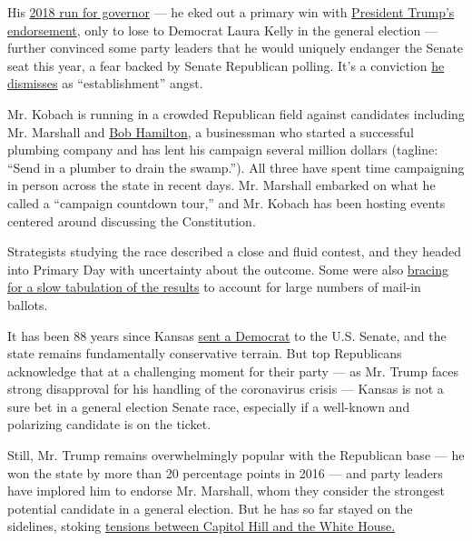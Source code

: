 His
\href{https://www.nytimes3xbfgragh.onion/2018/11/06/us/laura-kelly-wins-kansas-governors-race.html}{2018
run for governor} --- he eked out a primary win with
\href{https://www.nytimes3xbfgragh.onion/2018/08/06/us/politics/kris-kobach-trump-kansas.html}{President
Trump's endorsement}, only to lose to Democrat Laura Kelly in the
general election --- further convinced some party leaders that he would
uniquely endanger the Senate seat this year, a fear backed by Senate
Republican polling. It's a conviction
\href{https://www.nytimes3xbfgragh.onion/2020/07/30/us/politics/kansas-senate-kobach-trump.html}{he
dismisses} as ``establishment'' angst.

Mr. Kobach is running in a crowded Republican field against candidates
including Mr. Marshall and
\href{https://www.kansascity.com/news/politics-government/article244374532.html}{Bob
Hamilton}, a businessman who started a successful plumbing company and
has lent his campaign several million dollars (tagline: ``Send in a
plumber to drain the swamp.''). All three have spent time campaigning in
person across the state in recent days. Mr. Marshall embarked on what he
called a ``campaign countdown tour,'' and Mr. Kobach has been hosting
events centered around discussing the Constitution.

Strategists studying the race described a close and fluid contest, and
they headed into Primary Day with uncertainty about the outcome. Some
were also
\href{https://www.kansascity.com/news/politics-government/election/article244625722.html}{bracing
for a slow tabulation of the results} to account for large numbers of
mail-in ballots.

It has been 88 years since Kansas
\href{https://www.nytimes3xbfgragh.onion/2020/05/30/us/politics/kansas-senate-kobach.html}{sent
a Democrat} to the U.S. Senate, and the state remains fundamentally
conservative terrain. But top Republicans acknowledge that at a
challenging moment for their party --- as Mr. Trump faces strong
disapproval for his handling of the coronavirus crisis --- Kansas is not
a sure bet in a general election Senate race, especially if a well-known
and polarizing candidate is on the ticket.

Still, Mr. Trump remains overwhelmingly popular with the Republican base
--- he won the state by more than 20 percentage points in 2016 --- and
party leaders have implored him to endorse Mr. Marshall, whom they
consider the strongest potential candidate in a general election. But he
has so far stayed on the sidelines, stoking
\href{https://www.nytimes3xbfgragh.onion/2020/07/30/us/politics/kansas-senate-kobach-trump.html}{tensions
between Capitol Hill and the White House.}


